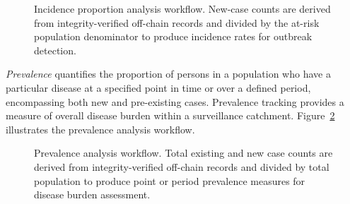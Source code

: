 \documentclass[AMA,LATO1COL]{WileyNJD-v2}
\begin{document}
\begin{figure}[!ht]
\centering
{}
\caption{Incidence proportion analysis workflow. New-case counts are derived from integrity-verified off-chain records and divided by the at-risk population denominator to produce incidence rates for outbreak detection.}\label{fig:incidence}
\end{figure}
%
%
%

\textit{Prevalence} quantifies the proportion of persons in a population who have a particular disease at a specified point in time or over a defined period, encompassing both new and pre-existing cases.\cite{cdc2012principles} Prevalence tracking provides a measure of overall disease burden within a surveillance catchment. Figure~\ref{fig:prevalence} illustrates the prevalence analysis workflow.

\begin{figure}[!ht]
\centering
{}
\caption{Prevalence analysis workflow. Total existing and new case counts are derived from integrity-verified off-chain records and divided by total population to produce point or period prevalence measures for disease burden assessment.}\label{fig:prevalence}
\end{figure}
%
%
%
\end{document}
